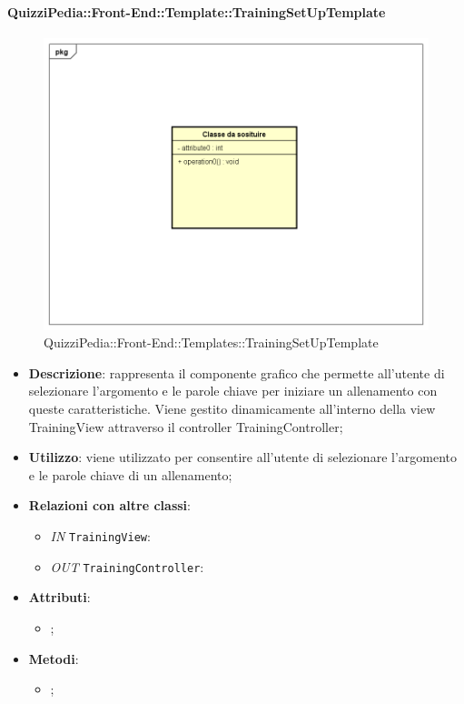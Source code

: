		\paragraph{QuizziPedia::Front-End::Template::TrainingSetUpTemplate}
		
				\label{QuizziPedia::Front-End::Templates::TrainingSetUpTemplate}

				\begin{figure}[h]
					\centering
					\includegraphics[scale=0.5,keepaspectratio]{UML/Classi/Front-End/Temporanea.png}
					\caption{QuizziPedia::Front-End::Templates::TrainingSetUpTemplate}
				\end{figure}
						
			\begin{itemize}
				\item \textbf{Descrizione}: rappresenta il componente grafico che permette all'utente di selezionare l'argomento e le parole chiave per iniziare un allenamento con queste caratteristiche. Viene gestito dinamicamente all'interno della view TrainingView attraverso il controller TrainingController;
				\item \textbf{Utilizzo}: viene utilizzato per consentire all'utente di selezionare l'argomento e le parole chiave di un allenamento;
				\item \textbf{Relazioni con altre classi}: 
					\begin{itemize}
						\item \textit{IN} \texttt{TrainingView}: 
						\item \textit{OUT} \texttt{TrainingController}:
					\end{itemize}
				\item \textbf{Attributi}: 
					\begin{itemize}
						\item ;
					\end{itemize}
				\item \textbf{Metodi}: 
					\begin{itemize}
						\item ;
					\end{itemize}
			\end{itemize}

